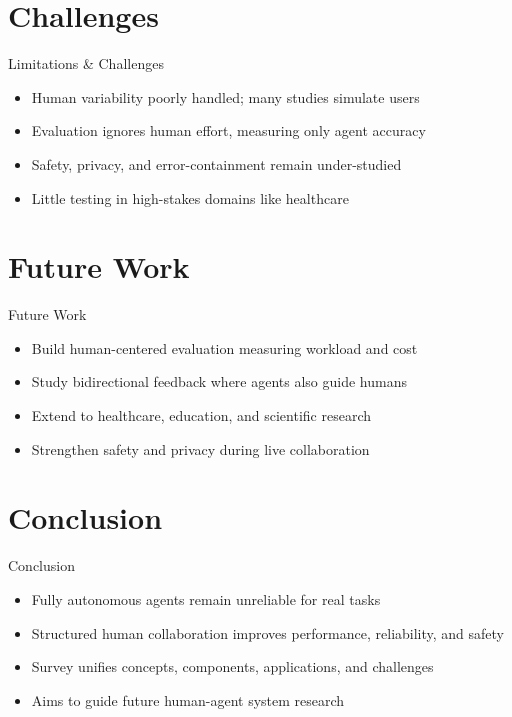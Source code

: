 \documentclass[10pt]{beamer}
\begin{document}
\section{Challenges}
\begin{frame}{Limitations \& Challenges}
\begin{itemize}
  \item Human variability poorly handled; many studies simulate users
  \item Evaluation ignores human effort, measuring only agent accuracy
  \item Safety, privacy, and error-containment remain under-studied
  \item Little testing in high-stakes domains like healthcare
\end{itemize}
\end{frame}

\section{Future Work}
\begin{frame}{Future Work}
\begin{itemize}
  \item Build human-centered evaluation measuring workload and cost
  \item Study bidirectional feedback where agents also guide humans
  \item Extend to healthcare, education, and scientific research
  \item Strengthen safety and privacy during live collaboration
\end{itemize}
\end{frame}

\section{Conclusion}
\begin{frame}{Conclusion}
\begin{itemize}
  \item Fully autonomous agents remain unreliable for real tasks
  \item Structured human collaboration improves performance, reliability, and safety
  \item Survey unifies concepts, components, applications, and challenges
  \item Aims to guide future human-agent system research
\end{itemize}
\end{frame}
\end{document}
